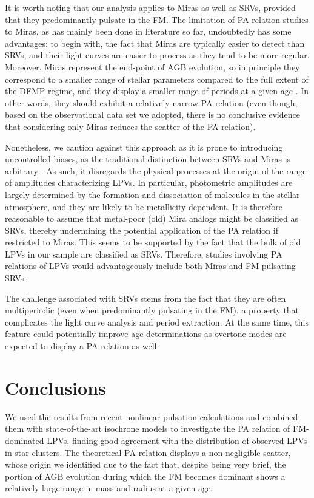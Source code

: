 \documentclass[letter]{aa}
\begin{document}
It is worth noting that our analysis applies to Miras as well as SRVs, provided that they predominantly pulsate in the FM. The limitation of PA relation studies to Miras, as has mainly been done in literature so far, undoubtedly has some advantages: to begin with, the fact that Miras are typically easier to detect than SRVs, and their light curves are easier to process as they tend to be more regular. Moreover, Miras represent the end-point of AGB evolution, so in principle they correspond to a smaller range of stellar parameters compared to the full extent of the DFMP regime, and they display a smaller range of periods at a given age \citep[cf.][]{FeastWhitelock_2000}. In other words, they should exhibit a relatively narrow PA relation (even though, based on the observational data set we adopted, there is no conclusive evidence that considering only Miras reduces the scatter of the PA relation).

Nonetheless, we caution against this approach as it is prone to introducing uncontrolled biases, as the traditional distinction between SRVs and Miras is arbitrary \citep[see][and references therein]{Trabucchi_etal_2021_SRV1}. As such, it disregards the physical processes at the origin of the range of amplitudes characterizing LPVs. In particular, photometric amplitudes are largely determined by the formation and dissociation of molecules in the stellar atmosphere, and they are likely to be metallicity-dependent. It is therefore reasonable to assume that metal-poor (old) Mira analogs might be classified as SRVs, thereby undermining the potential application of the PA relation if restricted to Miras. This seems to be supported by the fact that the bulk of old LPVs in our sample are classified as SRVs. Therefore, studies involving PA relations of LPVs would advantageously include both Miras and FM-pulsating SRVs.

The challenge associated with SRVs stems from the fact that they are often multiperiodic (even when predominantly pulsating in the FM), a property that complicates the light curve analysis and period extraction. At the same time, this feature could potentially improve age determinations as overtone modes are expected to display a PA relation as well.


\section{Conclusions}
\label{sec:Conclusions}

We used the results from recent nonlinear pulsation calculations and combined them with state-of-the-art isochrone models to investigate the PA relation of FM-dominated LPVs, finding good agreement with the distribution of observed LPVs in star clusters. The theoretical PA relation displays a non-negligible scatter, whose origin we identified due to the fact that, despite being very brief, the portion of AGB evolution during which the FM becomes dominant shows a relatively large range in mass and radius at a given age.
\end{document}
